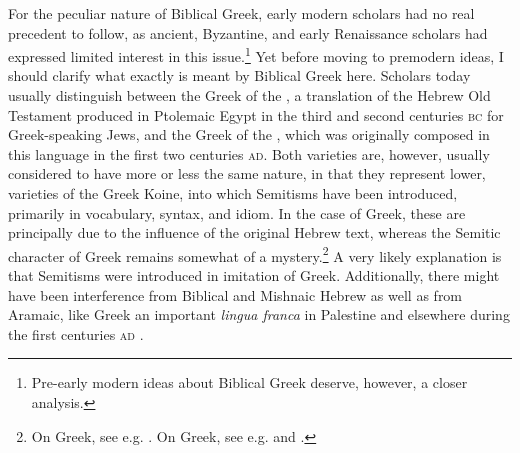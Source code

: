 For the peculiar nature of Biblical Greek, early modern scholars had no real precedent to follow, as ancient, Byzantine, and early Renaissance scholars had expressed limited interest in this issue.\footnote{Pre-early modern ideas about Biblical Greek deserve, however, a closer analysis.} Yet before moving to premodern ideas, I should clarify what exactly is meant by Biblical Greek here. Scholars today usually distinguish between the Greek of the , a translation of the Hebrew Old Testament produced in Ptolemaic Egypt in the third and second centuries \textsc{bc} for Greek-speaking Jews, and the Greek of the , which was originally composed in this language in the first two centuries \textsc{ad}. Both varieties are, however, usually considered to have more or less the same nature, in that they represent lower,  varieties of the Greek Koine, into which Semitisms have been introduced, primarily in vocabulary, syntax, and idiom. In the case of  Greek, these are principally due to the influence of the original Hebrew text, whereas the Semitic character of  Greek remains somewhat of a mystery.\footnote{On  Greek, see e.g. \citet[106--108]{Horrocks2010}. On  Greek, see e.g. \citet{Janse2007} and \citet{Porter2013}.} A very likely explanation is that Semitisms were introduced in imitation of  Greek. Additionally, there might have been interference from Biblical and Mishnaic Hebrew as well as from Aramaic, like Greek an important \textit{lingua franca} in Palestine and elsewhere during the first centuries \textsc{ad} \citep{Janse2007}.

